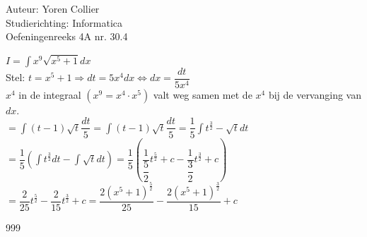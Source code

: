 \documentclass[a4paper]{article}
\newcommand{\asa}{\Leftrightarrow} %
\newcommand{\adR}{\Rightarrow} %
\newcommand{\Lh}{\left(} %
\newcommand{\Rh}{\right)}
\newcommand{\intgrl}{\displaystyle\int} %
\begin{document}
\noindent \large Auteur: Yoren Collier \\
\noindent \large Studierichting: Informatica\\
\noindent \large Oefeningenreeks 4A nr. 30.4\\

\medskip

\normalsize

$ I =  \intgrl x^9 \sqrt{x^5 +1} dx$\\

Stel: $t = x^5 +1 \adR dt = 5x^4dx \asa dx = \dfrac{dt}{5x^4} $\\

$x^4$ in de integraal $\Lh x^9 = x^4 \cdot x^5 \Rh$ valt weg samen met de $x^4$ bij de vervanging van $dx$.\\

$= \intgrl \Lh t-1 \Rh \sqrt{t} \dfrac{dt}{5} = \intgrl \Lh t-1 \Rh \sqrt{t} \dfrac{dt}{5} = \dfrac{1}{5} \intgrl t^{\tfrac{3}{2}} - \sqrt{t} dt$\\

$= \dfrac{1}{5} \Lh \intgrl t^{\tfrac{3}{2}} dt - \intgrl \sqrt{t} dt \Rh = \dfrac{1}{5} \Lh \dfrac{1}{\dfrac{5}{2}} t^{\tfrac{5}{2}} +c - \dfrac{1}{\dfrac{3}{2}} t^{\tfrac{3}{2}} +c \Rh$\\

$= \dfrac{2}{25} t^{\tfrac{5}{2}} - \dfrac{2}{15} t^{\tfrac{3}{2}} +c = \dfrac{2 \Lh x^5 +1 \Rh ^{\tfrac{5}{2}}}{25} - \dfrac{2 \Lh x^5 +1 \Rh ^{\tfrac{3}{2}}}{15} +c$\\

\begin{thebibliography}{999}
\end{thebibliography}
\end{document}
